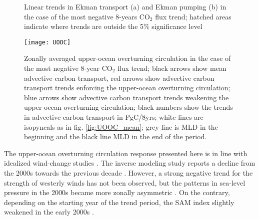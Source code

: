 \begin{figure}[h!]
	\centering
	\vspace{-5mm}
	\caption{Linear trends in Ekman transport (a) and Ekman pumping (b) in the case of the most negative 8-years CO$_2$ flux trend; hatched areas indicate where trends are outside the 5\% significance level}
	\label{fig:ekman_neg}
\end{figure}


\begin{figure}[h!]
	\centering
	\texttt{[image: UOOC]}
	\vspace{-10mm}
	\caption{Zonally averaged upper-ocean overturning circulation in the case of the most negative 8-year CO$_2$ flux trend; black arrows show mean advective carbon transport, red arrows show advective carbon transport trends enforcing the upper-ocean overturning circulation; blue arrows show advective carbon transport trends weakening the upper-ocean overturning circulation; black numbers show the trends in advective carbon transport in PgC/8yrs; white lines are isopyncals as in fig. \ref{fig:UOOC_mean}; grey line is \ac{MLD} in the beginning and the black line MLD in the end of the period.}%
	\label{fig:UOOC_neg}
\end{figure}


The upper-ocean overturning circulation response presented here is in line with idealized wind-change studies \citep{Lauderdale2013}. The inverse modeling study reports a decline from the 2000s towards the previous decade \citep{DeVries2017}. However, a strong negative trend for the strength of westerly winds has not been observed, but the patterns in sea-level pressure in the 2000s became more zonally asymmetric \citep{landschuetzer2015}. On the contrary, depending on the starting year of the trend period, the \acs{SAM} index slightly weakened in the early 2000s \citep{Marshall2003,Lovenduski2014}.


